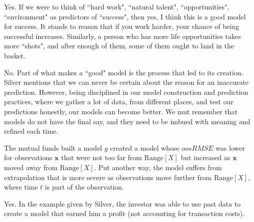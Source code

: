\documentclass[12pt]{article}
\begin{document}
\begin{enumerate}


Yes. If we were to think of ``hard work", ``natural talent", ``opportunities",
``environment" as predictors of ``success", then yes, I think this is
a good model for success. It stands to reason that if you work harder,
your chance of being successful increases. Similarly, a person who has
more life opportunities takes more ``shots", and after enough of them,
some of them ought to land in the basket. 


No. Part of what makes a ``good" model is the process that led to its creation.
Silver mentions that we can never be certain about the reason for an inaccurate
prediction. However, being disciplined in our model construction and prediction
practices, where we gather a lot of data, from different places, and test our
predictions honestly, our models can become better. We mut remember that models
do not have the final say, and they need to be imbued with meaning and
refined each time.


The mutual funds built a model $g$ created a model whose $oosRMSE$ was lower
for observations $\bm{x}$ that were not too far from $\text{Range}[X]$ but
increased as $\bm{x}$ moved away from $\text{Range}[X]$. Put another way,
the model suffers from extrapolation that is more severe as observations move
further from $\text{Range}[X]$, where time $t$ is part of the observation.


Yes. In the example given by Silver, the investor was able to use past data to create
a model that earned him a profit (not accounting for transaction costs).



\end{enumerate}
\end{document}
